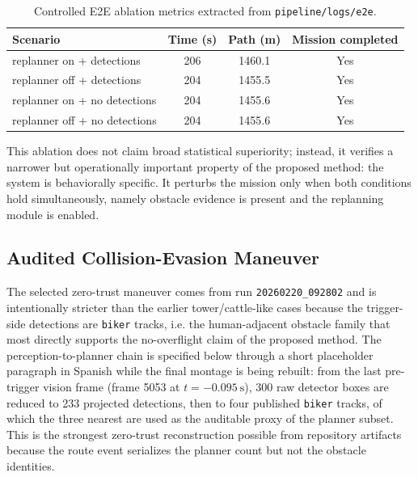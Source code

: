 \documentclass[a4paper,11pt]{article}
\begin{document}
\begin{table}[t]
    \centering
    \caption{Controlled E2E ablation metrics extracted from \texttt{pipeline/logs/e2e}.}
    \label{tab:e2e}
    \small
    \begin{tabularx}{\linewidth}{@{}Y S[table-format=3.0] S[table-format=4.1] c@{}}
        \toprule
        \textbf{Scenario} & {\textbf{Time (s)}} & {\textbf{Path (m)}} & \textbf{Mission completed} \\
        \midrule
        replanner on + detections & 206 & 1460.1 & Yes \\
        replanner off + detections & 204 & 1455.5 & Yes \\
        replanner on + no detections & 204 & 1455.6 & Yes \\
        replanner off + no detections & 204 & 1455.6 & Yes \\
        \bottomrule
    \end{tabularx}
\end{table}

This ablation does not claim broad statistical superiority; instead, it verifies a narrower but operationally important property of the proposed method: the system is behaviorally specific. It perturbs the mission only when both conditions hold simultaneously, namely obstacle evidence is present and the replanning module is enabled.

\subsection{Audited Collision-Evasion Maneuver}

The selected zero-trust maneuver comes from run \texttt{20260220\_092802} and is intentionally stricter than the earlier tower/cattle-like cases because the trigger-side detections are \texttt{biker} tracks, i.e. the human-adjacent obstacle family that most directly supports the no-overflight claim of the proposed method. The perception-to-planner chain is specified below through a short placeholder paragraph in Spanish while the final montage is being rebuilt: from the last pre-trigger vision frame (frame 5053 at \(t=-\SI{0.095}{\second}\)), 300 raw detector boxes are reduced to 233 projected detections, then to four published \texttt{biker} tracks, of which the three nearest are used as the auditable proxy of the planner subset. This is the strongest zero-trust reconstruction possible from repository artifacts because the route event serializes the planner count but not the obstacle identities.
\end{document}
